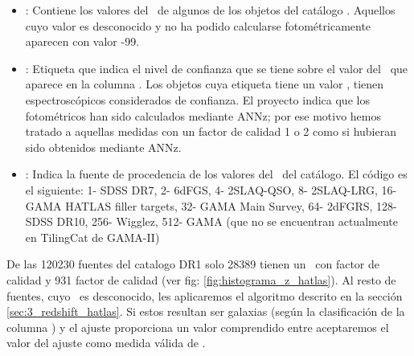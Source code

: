 \begin{itemize}
    \item {}: Contiene los valores del \rt\ de algunos de los objetos del catálogo \hatlas. Aquellos cuyo valor es desconocido y no ha podido calcularse fotométricamente aparecen con valor -99.		
    \item {}: Etiqueta que indica el nivel de confianza  que se tiene sobre el valor del \rt\ que aparece en la columna . Los objetos cuya etiqueta tiene un valor , tienen  espectroscópicos considerados de confianza. El proyecto indica que los  fotométricos han sido calculados mediante ANNz; por ese motivo hemos tratado a aquellas medidas con un factor de calidad 1 o 2 como si hubieran sido obtenidos mediante ANNz. 
    \item {}: Indica la fuente de procedencia de los valores del \rt\ del catálogo. El código es el siguiente: 1- SDSS DR7, 2- 6dFGS, 4- 2SLAQ-QSO, 8- 2SLAQ-LRG, 16- GAMA HATLAS filler targets, 32- GAMA Main Survey, 64- 2dFGRS, 128- SDSS DR10, 256- Wigglez, 512- GAMA (que no se encuentran actualmente en TilingCat de GAMA-II)
\end{itemize}

\newpage

De las 120230 fuentes del catalogo DR1 solo 28389 tienen un \rt\ con factor de calidad  y 931 factor de calidad  (ver fig: \ref{fig:histograma_z_hatlas}). Al resto de fuentes, cuyo \rt\ es desconocido, les aplicaremos el algoritmo descrito en la sección \ref{sec:3_redshift_hatlas}. Si estos resultan ser galaxias (según la clasificación de la columna ) y el ajuste proporciona un valor comprendido entre  aceptaremos el valor del ajuste como medida válida de . 

